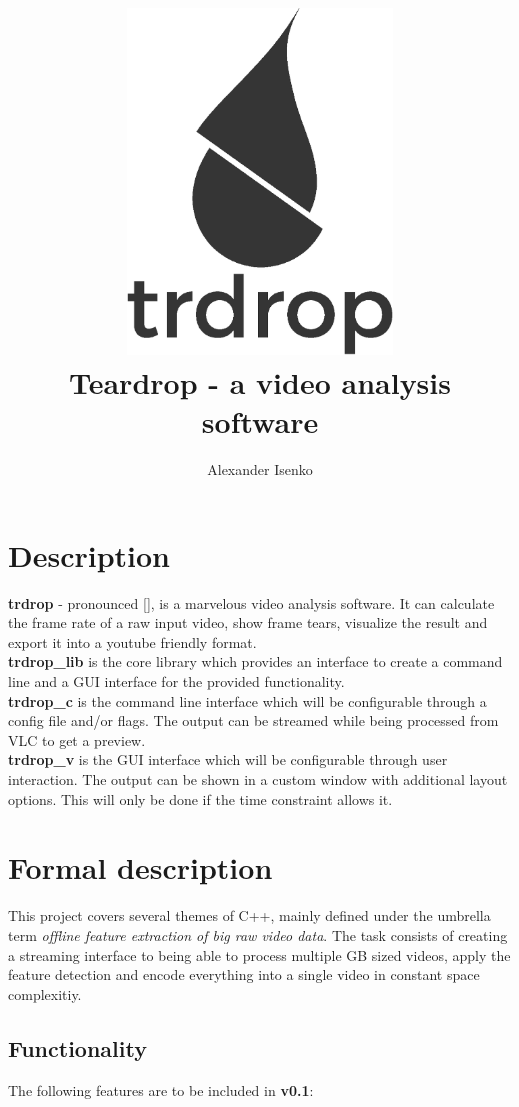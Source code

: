 \documentclass[titlepage]{article}
\title{\includegraphics[width=200pt, height=260pt]{../../images/trdrop_logo_text.eps} \\[50pt]
Teardrop - a video analysis software}
\author{Alexander Isenko}
\date{}
\begin{document}
\maketitle

\newpage

\section{Description}

\textbf{trdrop} - pronounced [\textit{}], is a marvelous video analysis software. It can calculate the frame rate of a raw input video, show frame tears, visualize the result and export it into a youtube friendly format. \\[2mm]
\hfill
\textbf{trdrop\_lib} is the core library which provides an interface to create a command line and a GUI interface for the provided functionality. \\[2mm]
\hfill
\textbf{trdrop\_c} is the command line interface which will be configurable through a config file and/or flags. The output can be streamed while being processed from VLC to get a preview. \\[2mm]
\hfill
\textbf{trdrop\_v} is the GUI interface which will be configurable through user interaction. The output can be shown in a custom window with additional layout options. This will only be done if the time constraint allows it.

\section{Formal description}

This project covers several themes of C++, mainly defined under the umbrella term \textit{offline feature extraction of big raw video data}. The task consists of creating a streaming interface to being able to process multiple GB sized videos, apply the feature detection and encode everything into a single video in constant space complexitiy.

\subsection{Functionality}

The following features are to be included in \textbf{v0.1}:
\end{document}
